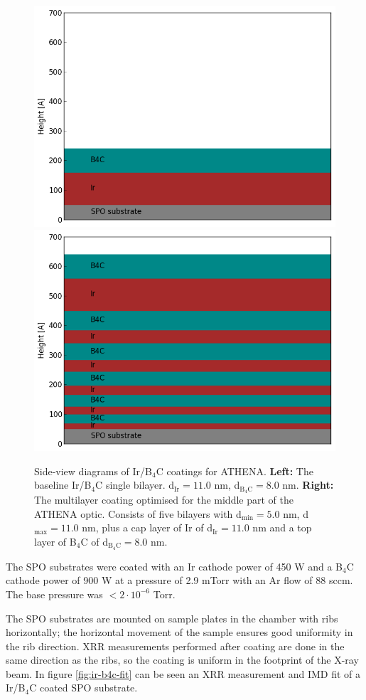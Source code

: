 \begin{figure}[!h]
  \center
\includegraphics[width=0.4\linewidth]{figures/athena/coating_on_spo/ir-b4c-baseline.png}
  \includegraphics[width=0.4\linewidth]{figures/athena/coating_on_spo/ir-b4c-ml.png}
\caption{\footnotesize Side-view diagrams of Ir/B$_4$C coatings for ATHENA. \textbf{Left:} The baseline Ir/B$_4$C single bilayer. d$_{\text{Ir}} = 11.0$ nm,  d$_{\text{B}_4\text{C}} = 8.0$ nm. \textbf{Right:} The multilayer coating optimised for the middle part of the ATHENA optic. Consists of five bilayers with d$_{\text{min}} = 5.0$ nm, d$_{\text{max}} = 11.0$ nm, plus a cap layer of Ir of d$_{\text{Ir}} = 11.0$ nm and a top layer of B$_4$C of d$_{\text{B}_4\text{C}} = 8.0$ nm.}\label{fig:ml_baseline_sideview}
\end{figure}

The SPO substrates were coated with an Ir cathode power of 450 W and a B$_4$C cathode power of 900 W at a pressure of 2.9 mTorr with an Ar flow of 88 sccm. The base pressure was $< 2\cdot10^{-6}$ Torr.

The SPO substrates are mounted on sample plates in the chamber with ribs horizontally; the horizontal movement of the sample ensures good uniformity in the rib direction. XRR measurements performed after coating are done in the same direction as the ribs, so the coating is uniform in the footprint of the X-ray beam. In figure \ref{fig:ir-b4c-fit} can be seen an XRR measurement and IMD fit of a Ir/B$_4$C coated SPO substrate.

